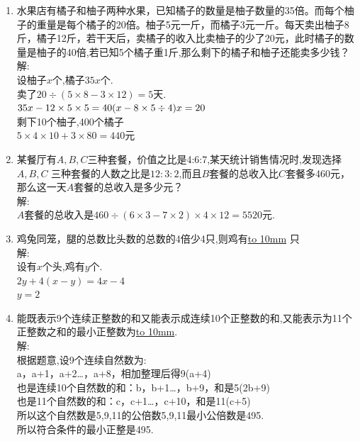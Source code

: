 \documentclass[12pt,oneside,a4paper]{ctexbook} %
\numberwithin{chapter}{part}
\begin{document}
\begin{enumerate}
\item 
水果店有橘子和柚子两种水果，已知橘子的数量是柚子数量的35倍。而每个柚子的重量是每个橘子的20倍。柚子5元一斤，而橘子3元一斤。每天卖出柚子8斤，橘子12斤，若干天后，卖橘子的收入比卖柚子的少了20元，此时橘子的数量是柚子的40倍,若已知5个橘子重1斤,那么剩下的橘子和柚子还能卖多少钱？\\
解:\\
设柚子$x$个,橘子$35x$个.\\
卖了$20\div(5\times8-3\times12)=5$天.\\
$35x-12\times5\times5=40(x-8\times5\div4)\\
x=20$\\
剩下10个柚子,400个橘子\\
$5\times4\times10+3\times80=440$元

\item 
某餐厅有$A,B,C$三种套餐，价值之比是4:6:7,某天统计销售情况时,发现选择$A,B,C$
三种套餐的人数之比是$12:3:2$,而且$B$套餐的总收入比$C$套餐多460元，
那么这一天$A$套餐的总收入是多少元？\\
解:\\
$A$套餐的总收入是$460\div(6\times3-7\times2)\times4\times12=5520$元.

\item 
鸡兔同笼，腿的总数比头数的总数的4倍少4只,则鸡有\underline{\hbox to 10mm{}} 只\\
解:\\
设有$x$个头,鸡有$y$个.\\
$2y+4(x-y)=4x-4$\\
$y=2$

\item 
能既表示9个连续正整数的和又能表示成连续10个正整数的和,又能表示为11个正整数之和的最小正整数为\underline{\hbox to 10mm{}}.\\
解:\\
根据题意,设9个连续自然数为:\\
a，a+1，a+2…，a+8，相加整理后得9(a+4)\\
也是连续10个自然数的和：b，b+1…，b+9，和是5(2b+9)\\
也是11个自然数的和：c，c+1…，c+10，和是11(c+5)\\
所以这个自然数是5,9,11的公倍数5,9,11最小公倍数是495.\\
所以符合条件的最小正整是495.


\end{enumerate}
\end{document}
